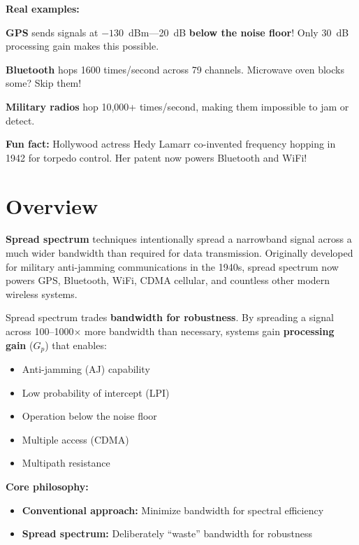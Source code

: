 \begin{nontechnical}
\textbf{Real examples:}

\textbf{GPS} sends signals at $-130$~dBm---20~dB \textbf{below the noise floor}! Only 30~dB processing gain makes this possible.

\textbf{Bluetooth} hops 1600 times/second across 79 channels. Microwave oven blocks some? Skip them!

\textbf{Military radios} hop 10,000+ times/second, making them impossible to jam or detect.

\textbf{Fun fact:} Hollywood actress Hedy Lamarr co-invented frequency hopping in 1942 for torpedo control. Her patent now powers Bluetooth and WiFi!
\end{nontechnical}

\section{Overview}

\textbf{Spread spectrum} techniques intentionally spread a narrowband signal across a much wider bandwidth than required for data transmission. Originally developed for military anti-jamming communications in the 1940s, spread spectrum now powers GPS, Bluetooth, WiFi, CDMA cellular, and countless other modern wireless systems.

\begin{keyconcept}
Spread spectrum trades \textbf{bandwidth for robustness}. By spreading a signal across 100--1000$\times$ more bandwidth than necessary, systems gain \textbf{processing gain} ($G_p$) that enables:
\begin{itemize}
\item Anti-jamming (AJ) capability
\item Low probability of intercept (LPI)
\item Operation below the noise floor
\item Multiple access (CDMA)
\item Multipath resistance
\end{itemize}
\end{keyconcept}

\textbf{Core philosophy:}
\begin{itemize}
\item \textbf{Conventional approach:} Minimize bandwidth for spectral efficiency
\item \textbf{Spread spectrum:} Deliberately ``waste'' bandwidth for robustness
\end{itemize}

